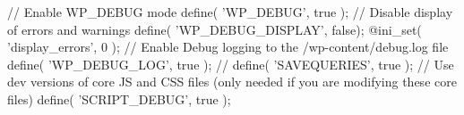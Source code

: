 // Enable WP_DEBUG mode
define( 'WP_DEBUG', true );
// Disable display of errors and warnings
define( 'WP_DEBUG_DISPLAY', false);
@ini_set( 'display_errors', 0 );
// Enable Debug logging to the /wp-content/debug.log file
define( 'WP_DEBUG_LOG', true );
// define( 'SAVEQUERIES', true );
// Use dev versions of core JS and CSS files (only needed if you are modifying these core files)
define( 'SCRIPT_DEBUG', true );
